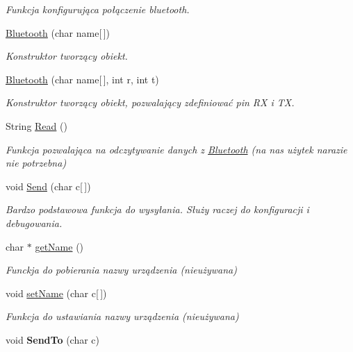 \begin{DoxyCompactItemize}
\begin{DoxyCompactList}\small\item\em Funkcja konfigurująca połączenie bluetooth. \end{DoxyCompactList}\item 
\hyperlink{class_bluetooth_a2b16cce352d8272696d00d50ec408ba2}{Bluetooth} (char name\mbox{[}$\,$\mbox{]})
\begin{DoxyCompactList}\small\item\em Konstruktor tworzący obiekt. \end{DoxyCompactList}\item 
\hyperlink{class_bluetooth_a8dec42f3f70d912ae6d58c1b3700f739}{Bluetooth} (char name\mbox{[}$\,$\mbox{]}, int r, int t)
\begin{DoxyCompactList}\small\item\em Konstruktor tworzący obiekt, pozwalający zdefiniować pin R\+X i T\+X. \end{DoxyCompactList}\item 
String \hyperlink{class_bluetooth_abcd247762699faf427b70f515ab01520}{Read} ()
\begin{DoxyCompactList}\small\item\em Funkcja pozwalająca na odczytywanie danych z \hyperlink{class_bluetooth}{Bluetooth} (na nas użytek narazie nie potrzebna) \end{DoxyCompactList}\item 
void \hyperlink{class_bluetooth_a13527db977e5a6086a83a83343eda885}{Send} (char c\mbox{[}$\,$\mbox{]})
\begin{DoxyCompactList}\small\item\em Bardzo podstawowa funkcja do wysyłania. Służy raczej do konfiguracji i debugowania. \end{DoxyCompactList}\item 
char $\ast$ \hyperlink{class_bluetooth_a962e80ae56550f97cfb6c909b945abd3}{get\+Name} ()
\begin{DoxyCompactList}\small\item\em Funckja do pobierania nazwy urządzenia (nieużywana) \end{DoxyCompactList}\item 
void \hyperlink{class_bluetooth_a282df2e1ef793b0b8cab4b217e86e69e}{set\+Name} (char c\mbox{[}$\,$\mbox{]})
\begin{DoxyCompactList}\small\item\em Funkcja do ustawiania nazwy urządzenia (nieużywana) \end{DoxyCompactList}\item 
\hypertarget{class_bluetooth_aa0ef2bbac247bdce9b45067fb3a9cbcd}{}void {\bfseries Send\+To} (char c)\label{class_bluetooth_aa0ef2bbac247bdce9b45067fb3a9cbcd}


\end{DoxyCompactItemize}
